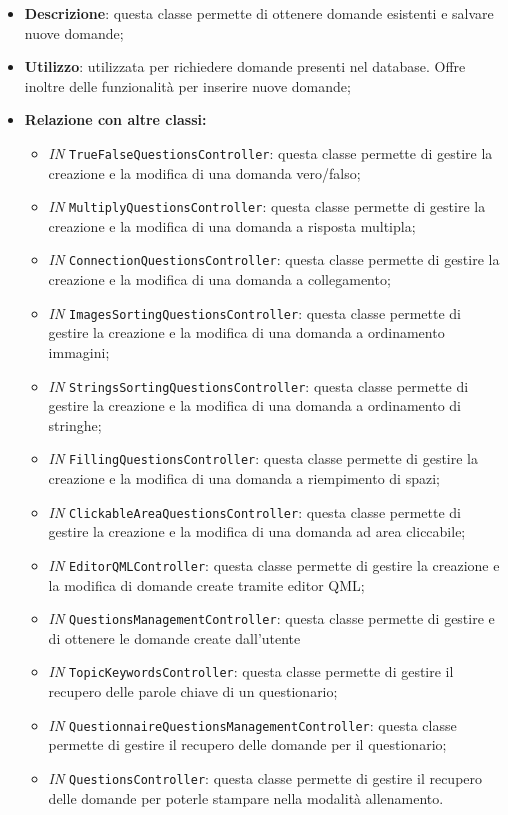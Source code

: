 \begin{itemize}
	\item \textbf{Descrizione}: questa classe permette di ottenere domande esistenti e salvare nuove domande;
	\item \textbf{Utilizzo}: utilizzata per richiedere domande presenti nel database. Offre inoltre delle funzionalità per inserire nuove domande;
	\item \textbf{Relazione con altre classi:}
	\begin{itemize}
		\item \textit{IN} \texttt{TrueFalseQuestionsController}: questa classe permette di gestire la creazione e la modifica di una domanda vero/falso;
		\item \textit{IN} \texttt{MultiplyQuestionsController}: questa classe permette di gestire la creazione e la modifica di una domanda a risposta multipla; 
		\item \textit{IN} \texttt{ConnectionQuestionsController}: questa classe permette di gestire la creazione e la modifica di una domanda a collegamento;
		\item \textit{IN} \texttt{ImagesSortingQuestionsController}: questa classe permette di gestire la creazione e la modifica di una domanda a ordinamento immagini;
		\item \textit{IN} \texttt{StringsSortingQuestionsController}: questa classe permette di gestire la creazione e la modifica di una domanda a ordinamento di stringhe;
		\item \textit{IN} \texttt{FillingQuestionsController}: questa classe permette di gestire la creazione e la modifica di una domanda a riempimento di spazi; 
		\item \textit{IN} \texttt{ClickableAreaQuestionsController}: questa classe permette di gestire la creazione e la modifica di una domanda ad area cliccabile;
		\item \textit{IN} \texttt{EditorQMLController}: questa classe permette di gestire la creazione e la modifica di domande create tramite editor QML;
		\item \textit{IN} \texttt{QuestionsManagementController}: questa classe permette di gestire e di ottenere le domande create dall'utente
		\item \textit{IN} \texttt{TopicKeywordsController}: questa classe permette di gestire il recupero delle parole chiave di un questionario;
		\item \textit{IN} \texttt{QuestionnaireQuestionsManagementController}: questa classe permette di gestire il recupero delle domande per il questionario;
		\item \textit{IN} \texttt{QuestionsController}: questa classe permette di gestire il recupero delle domande per poterle stampare nella modalità allenamento.
		

\end{itemize}
\end{itemize}
